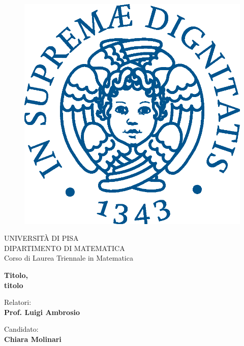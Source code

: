\begin{titlepage}
\begin{figure}[!htb]
    \centering
    \includegraphics[keepaspectratio=true,scale=0.5]{cherubino_pant541.eps}
\end{figure}

\begin{center}
    \LARGE{UNIVERSITÀ DI PISA}
    \vspace{5mm}
    \\ \large{DIPARTIMENTO DI MATEMATICA}
    \vspace{5mm}
    \\ \LARGE{Corso di Laurea Triennale in Matematica}
\end{center}

\vspace{15mm}
\begin{center}
    {\LARGE{\bf Titolo,\\\vspace{5mm}titolo}}
\end{center}
\vspace{30mm}

\begin{minipage}[t]{0.47\textwidth}
	{\large{Relatori:}{\normalsize\vspace{3mm}
	\bf\\ \large{Prof. Luigi Ambrosio}}}
\end{minipage}
\hfill
\begin{minipage}[t]{0.47\textwidth}\raggedleft
	{\large{Candidato:}{\normalsize\vspace{3mm} \bf\\ \large{Chiara Molinari\\ }}}
\end{minipage}

\vspace{30mm}
\hrulefill
\\

\end{titlepage}